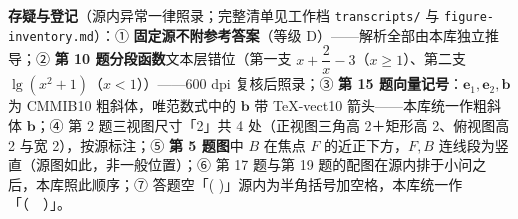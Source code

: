 \begin{gktip}
\textbf{存疑与登记}（源内异常一律照录；完整清单见工作档 \texttt{transcripts/} 与 \texttt{figure-inventory.md}）：① \textbf{固定源不附参考答案}（等级 D）——解析全部由本库独立推导；② \textbf{第 10 题分段函数}文本层错位（第一支 \(x+\dfrac{2}{x}-3\)（\(x\geqslant1\)）、第二支 \(\lg\left(x^2+1\right)\)（\(x<1\)））——600 dpi 复核后照录；③ \textbf{第 15 题向量记号}：\(\boldsymbol{e}_1,\boldsymbol{e}_2,\boldsymbol{b}\) 为 CMMIB10 粗斜体，唯范数式中的 \(\boldsymbol{b}\) 带 TeX-vect10 箭头——本库统一作粗斜体 \(\boldsymbol{b}\)；④ 第 2 题三视图尺寸「2」共 4 处（正视图三角高 2＋矩形高 2、俯视图高 2 与宽 2），按源标注；⑤ \textbf{第 5 题图}中 \(B\) 在焦点 \(F\) 的近正下方，\(F,B\) 连线段为竖直（源图如此，非一般位置）；⑥ 第 17 题与第 19 题的配图在源内排于小问之后，本库照此顺序；⑦ 答题空「( )」源内为半角括号加空格，本库统一作「（　）」。
\end{gktip}



